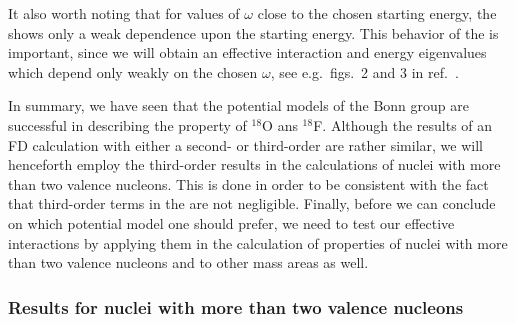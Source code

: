 It also worth noting that for values
of $\omega$ close to the chosen starting energy, the \qbox
shows only a weak dependence upon the starting energy.
This behavior of
the \qbox is important, since we will obtain an effective interaction
and energy eigenvalues which depend only weakly on the chosen
$\omega$, see e.g.\ figs.\ 2 and 3 in ref.\ \cite{eehho94}.


In summary, we have seen that the potential models
of the Bonn group are successful in describing the property
of $^{18}$O ans $^{18}$F. Although the results of an FD
calculation with either a second- or third-order \qbox are
rather similar, we will henceforth employ the third-order
results in the calculations of nuclei with more than two
valence nucleons. This is done in order to be consistent with
the fact that third-order terms in the \qbox are not negligible.
Finally,
before
we can conclude on which potential model one should prefer,
we need to test our effective interactions by applying
them in the calculation of properties of nuclei with more than
two valence nucleons and to other mass areas as well.



\subsubsection{Results for nuclei with more than two valence nucleons}

